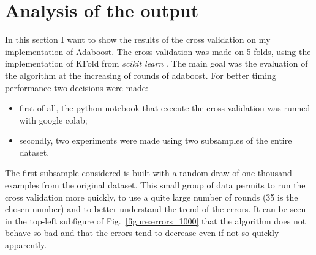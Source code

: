 \documentclass{scrartcl}
\begin{document}
\section{Analysis of the output}
In this section I want to show the results of the cross validation on my implementation of Adaboost. The cross validation was made on 5 folds, using the implementation of KFold from \textit{scikit learn} \cite{kfold}. 
The main goal was the evaluation of the algorithm at the increasing of rounds of adaboost. For better timing performance two decisions were made:
\begin{itemize}
\item first of all, the python notebook that execute the cross validation was runned with google colab;
\item secondly, two experiments were made using two subsamples of the entire dataset.
\end{itemize}

The first subsample considered is built with a random draw of one thousand examples from the original dataset. This small group of data permits to run the cross validation more quickly, to use a quite large number of rounds (35 is the chosen number) and to better understand the trend of the errors. It can be seen in the top-left subfigure of Fig.~\ref{figure:errors_1000} that the algorithm does not behave so bad and that the errors tend to decrease even if not so quickly apparently.
\end{document}
